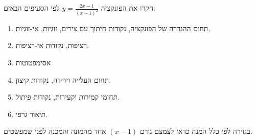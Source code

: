 
\begin{question}
חקרו את הפונקציה $y=\frac{2x-1}{(x-1)^2}$ לפי הסעיפים הבאים:
\begin{enumerate}
  \item תחום ההגדרה של הפונקציה, נקודות חיתוך עם צירים, זוגיות, אי-זוגיות.
  \item רציפות, נקודות אי-רציפות.
  \item אסימפטוטות
  \item תחום העלייה וירידה, נקודות קיצון.
  \item תחומי קמירות וקעירות, נקודות פיתול.
  \item תיאור גרפי.
\end{enumerate}
\end{question}

\begin{hint}
בגזירה לפי כלל המנה כדאי לצמצם גורם $(x-1)$ אחד מהמונה והמכנה לפני שמפשטים.
\end{hint}

